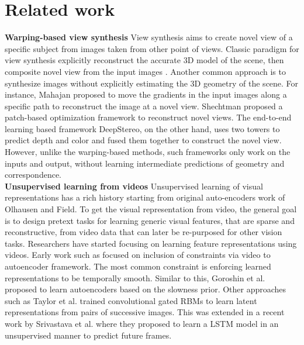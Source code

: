 \documentclass[10pt,twocolumn,letterpaper]{article}
\begin{document}
\section{Related work}
\textbf{Warping-based view synthesis}
View synthesis aims to create novel view of a specific subject from images taken from other point of views. Classic paradigm for view synthesis explicitly reconstruct the accurate 3D model of the scene, then composite novel view from the input images \cite{malik1996modeling}\cite{fitzgibbon2005image}\cite{DBLP:journals/tog/ZitnickKUWS04}. Another common approach is to synthesize images without explicitly estimating the 3D geometry of the scene. For instance, Mahajan\cite{shechtman2010regenerative} proposed to move the gradients in the input images along a specific path to reconstruct the image at a novel view. Shechtman\cite{shechtman2010regenerative} proposed a patch-based optimization framework to reconstruct novel views. The end-to-end learning based framework DeepStereo\cite{DBLP:journals/corr/FlynnNPS15}, on the other hand, uses two towers to predict depth and color and fused them together to construct the novel view.  However, unlike the warping-based methods, such frameworks only work on the inputs and output, without learning intermediate predictions of geometry and correspondence. 
\\
\textbf{Unsupervised learning from videos} Unsupervised learning of visual representations has a
rich history starting from original auto-encoders work of Olhausen and Field\cite{olshausen1997sparse}. To get the visual representation from video, the general goal is to design pretext tasks for learning generic visual features, that are sparse and reconstructive, from video data that can later be re-purposed for other vision tasks. Researchers have started focusing on learning feature representations using videos. Early work such as\cite{zou2012deep} focused on inclusion of constraints via video to autoencoder framework. The most common constraint is enforcing learned representations to be temporally smooth. Similar to this, Goroshin et al.\cite{goroshin2015unsupervised} proposed to learn autoencoders based on the slowness prior. Other approaches such as Taylor et al.\cite{taylor2010convolutional} trained convolutional gated RBMs to learn latent representations from pairs of successive images. This was extended in a recent work by Srivastava et al.\cite{srivastava2015unsupervised} where they proposed to learn a LSTM model in an unsupervised manner to predict future frames.
\\
\end{document}
